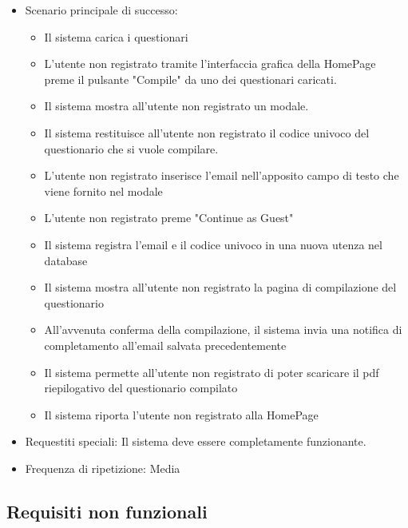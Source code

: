 \documentclass[12pt]{article}
\begin{document}
	\begin{itemize}
		\item Scenario principale di successo: 
		\begin{itemize}
			\item Il sistema carica i questionari
			\item L'utente non registrato tramite l'interfaccia grafica della HomePage preme il pulsante "Compile" da uno dei questionari caricati.
			\item Il sistema mostra all'utente non registrato un modale.
			\item Il sistema restituisce all'utente non registrato il codice univoco del questionario che si vuole compilare.
			\item L'utente non registrato inserisce l'email nell'apposito campo di testo che viene fornito nel modale
			\item L'utente non registrato preme "Continue as Guest"
			\item Il sistema registra l'email e il codice univoco in una nuova utenza nel database
			\item Il sistema mostra all'utente non registrato la pagina di compilazione del questionario
			\item All'avvenuta conferma della compilazione, il sistema invia una notifica di completamento all'email salvata precedentemente
			\item Il sistema permette all'utente non registrato di poter scaricare il pdf riepilogativo del questionario compilato
			\item Il sistema riporta l'utente non registrato alla HomePage
		\end{itemize}
	\end{itemize}
	\begin{itemize}
		\item Requestiti speciali: Il sistema deve essere completamente funzionante.
	\end{itemize}
	\begin{itemize}
		\item Frequenza di ripetizione: Media
	\end{itemize}
	
	\subsection{Requisiti non funzionali}
	
\end{document}
